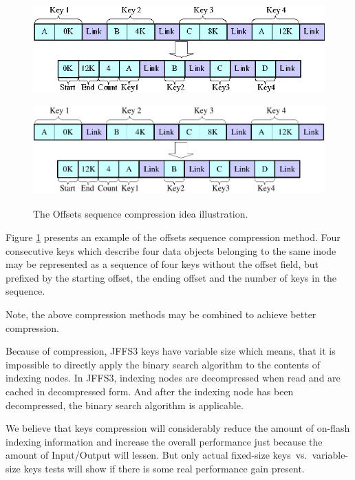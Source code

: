 \begin{description}
%
%
\begin{figure}[h]
\begin{center}
\begin{htmlonly}
\includegraphics{pics/comprex-02.png}
\end{htmlonly}
\includegraphics[width=160mm,height=42mm]{pics/comprex-02.pdf}
\end{center}
\caption{The Offsets sequence compression idea illustration.}
\label{ref_FigureKeyComprEx_02}
\end{figure}

Figure \ref{ref_FigureKeyComprEx_02} presents an example of the offsets sequence
compression method. Four consecutive keys which describe four data objects
belonging to the same inode may be represented as a sequence of four keys
without the offset field, but prefixed by the starting offset, the ending
offset and the number of keys in the sequence.

\end{description}

Note, the above compression methods may be combined to achieve better
compression.

Because of compression, JFFS3 keys have variable size which means, that it is
impossible to directly apply the binary search algorithm to the contents of
indexing nodes. In JFFS3, indexing nodes are decompressed when read and are
cached in decompressed form. And after the indexing node has been decompressed,
the binary search algorithm is applicable.

We believe that keys compression will considerably reduce the amount of
\mbox{on-flash} indexing information and increase the overall performance just
because the amount of Input/Output will lessen. But only actual
\mbox{fixed-size} keys~vs.~\mbox{variable-size} keys tests will show if there
is some real performance gain present.

